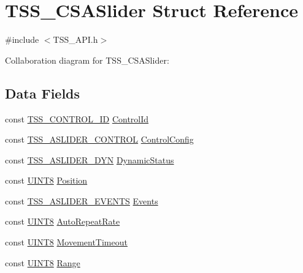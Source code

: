 \hypertarget{struct_t_s_s___c_s_a_slider}{}\section{T\+S\+S\+\_\+\+C\+S\+A\+Slider Struct Reference}
\label{struct_t_s_s___c_s_a_slider}


{\ttfamily \#include $<$T\+S\+S\+\_\+\+A\+P\+I.\+h$>$}



Collaboration diagram for T\+S\+S\+\_\+\+C\+S\+A\+Slider\+:
\subsection*{Data Fields}
\begin{DoxyCompactItemize}
\item 
const \hyperlink{struct_t_s_s___c_o_n_t_r_o_l___i_d}{T\+S\+S\+\_\+\+C\+O\+N\+T\+R\+O\+L\+\_\+\+ID} \hyperlink{struct_t_s_s___c_s_a_slider_afcbd53ab3bcf97cfd8d0a8b45863e11a}{Control\+Id}
\item 
const \hyperlink{struct_t_s_s___a_s_l_i_d_e_r___c_o_n_t_r_o_l}{T\+S\+S\+\_\+\+A\+S\+L\+I\+D\+E\+R\+\_\+\+C\+O\+N\+T\+R\+OL} \hyperlink{struct_t_s_s___c_s_a_slider_a5b94b5e450afad633a54cc029089f070}{Control\+Config}
\item 
const \hyperlink{struct_t_s_s___a_s_l_i_d_e_r___d_y_n}{T\+S\+S\+\_\+\+A\+S\+L\+I\+D\+E\+R\+\_\+\+D\+YN} \hyperlink{struct_t_s_s___c_s_a_slider_a84789a0c69de76718237d5a351fc354c}{Dynamic\+Status}
\item 
const \hyperlink{_t_s_s___data_types_8h_ab27e9918b538ce9d8ca692479b375b6a}{U\+I\+N\+T8} \hyperlink{struct_t_s_s___c_s_a_slider_aa2a6e9823c32640f1d5a01f97ffc0cae}{Position}
\item 
const \hyperlink{struct_t_s_s___a_s_l_i_d_e_r___e_v_e_n_t_s}{T\+S\+S\+\_\+\+A\+S\+L\+I\+D\+E\+R\+\_\+\+E\+V\+E\+N\+TS} \hyperlink{struct_t_s_s___c_s_a_slider_aa6978492052696699727c15985c4e547}{Events}
\item 
const \hyperlink{_t_s_s___data_types_8h_ab27e9918b538ce9d8ca692479b375b6a}{U\+I\+N\+T8} \hyperlink{struct_t_s_s___c_s_a_slider_aef1117c410a59acb56f45d9674e0dd56}{Auto\+Repeat\+Rate}
\item 
const \hyperlink{_t_s_s___data_types_8h_ab27e9918b538ce9d8ca692479b375b6a}{U\+I\+N\+T8} \hyperlink{struct_t_s_s___c_s_a_slider_ad3e98b5d97454837cd6293b7abffbe9f}{Movement\+Timeout}
\item 
const \hyperlink{_t_s_s___data_types_8h_ab27e9918b538ce9d8ca692479b375b6a}{U\+I\+N\+T8} \hyperlink{struct_t_s_s___c_s_a_slider_ac3bbfb6603540e32d0c07254344b524c}{Range}
\end{DoxyCompactItemize}


